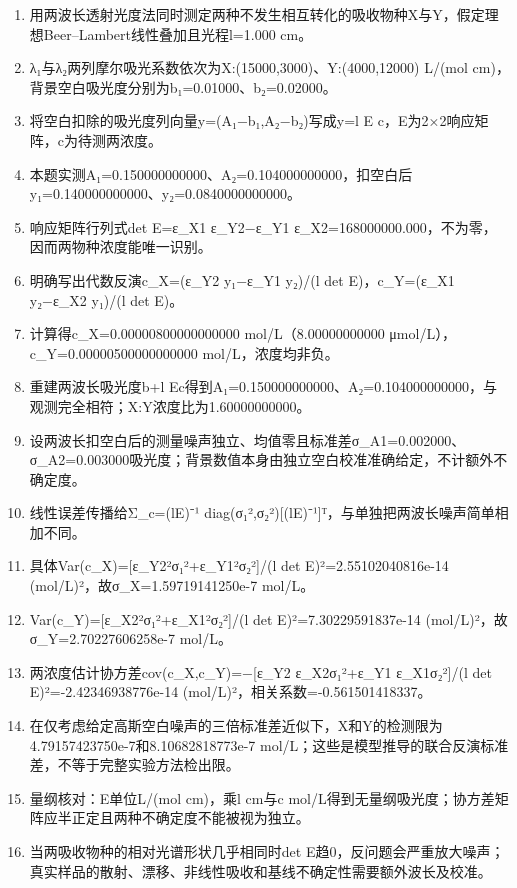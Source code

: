 \documentclass[UTF8,11pt,a4paper]{ctexart}
\begin{document}
\begin{enumerate}
\item 用两波长透射光度法同时测定两种不发生相互转化的吸收物种X与Y，假定理想Beer–Lambert线性叠加且光程l=1.000 cm。
\item λ₁与λ₂两列摩尔吸光系数依次为X:(15000,3000)、Y:(4000,12000) L/(mol cm)，背景空白吸光度分别为b₁=0.01000、b₂=0.02000。
\item 将空白扣除的吸光度列向量y=(A₁−b₁,A₂−b₂)写成y=l E c，E为2×2响应矩阵，c为待测两浓度。
\item 本题实测A₁=0.150000000000、A₂=0.104000000000，扣空白后y₁=0.140000000000、y₂=0.0840000000000。
\item 响应矩阵行列式det E=ε\_X1 ε\_Y2−ε\_Y1 ε\_X2=168000000.000，不为零，因而两物种浓度能唯一识别。
\item 明确写出代数反演c\_X=(ε\_Y2 y₁−ε\_Y1 y₂)/(l det E)，c\_Y=(ε\_X1 y₂−ε\_X2 y₁)/(l det E)。
\item 计算得c\_X=0.00000800000000000 mol/L（8.00000000000 μmol/L），c\_Y=0.00000500000000000 mol/L，浓度均非负。
\item 重建两波长吸光度b+l Ec得到A₁=0.150000000000、A₂=0.104000000000，与观测完全相符；X:Y浓度比为1.60000000000。
\item 设两波长扣空白后的测量噪声独立、均值零且标准差σ\_A1=0.002000、σ\_A2=0.003000吸光度；背景数值本身由独立空白校准准确给定，不计额外不确定度。
\item 线性误差传播给Σ\_c=(lE)⁻¹ diag(σ₁²,σ₂²)[(lE)⁻¹]ᵀ，与单独把两波长噪声简单相加不同。
\item 具体Var(c\_X)=[ε\_Y2²σ₁²+ε\_Y1²σ₂²]/(l det E)²=2.55102040816e-14 (mol/L)²，故σ\_X=1.59719141250e-7 mol/L。
\item Var(c\_Y)=[ε\_X2²σ₁²+ε\_X1²σ₂²]/(l det E)²=7.30229591837e-14 (mol/L)²，故σ\_Y=2.70227606258e-7 mol/L。
\item 两浓度估计协方差cov(c\_X,c\_Y)=−[ε\_Y2 ε\_X2σ₁²+ε\_Y1 ε\_X1σ₂²]/(l det E)²=-2.42346938776e-14 (mol/L)²，相关系数=-0.561501418337。
\item 在仅考虑给定高斯空白噪声的三倍标准差近似下，X和Y的检测限为4.79157423750e-7和8.10682818773e-7 mol/L；这些是模型推导的联合反演标准差，不等于完整实验方法检出限。
\item 量纲核对：E单位L/(mol cm)，乘l cm与c mol/L得到无量纲吸光度；协方差矩阵应半正定且两种不确定度不能被视为独立。
\item 当两吸收物种的相对光谱形状几乎相同时det E趋0，反问题会严重放大噪声；真实样品的散射、漂移、非线性吸收和基线不确定性需要额外波长及校准。
\end{enumerate}
\end{document}
